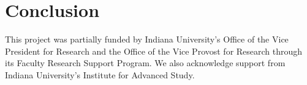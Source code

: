 \documentclass[preprint]{sigplanconf}
\begin{document}
\section{Conclusion}

\acks This project was partially funded by Indiana University's Office
of the Vice President for Research and the Office of the Vice Provost
for Research through its Faculty Research Support Program.  We also
acknowledge support from Indiana University's Institute for Advanced
Study.

\begin{small}


\end{small}
\end{document}
